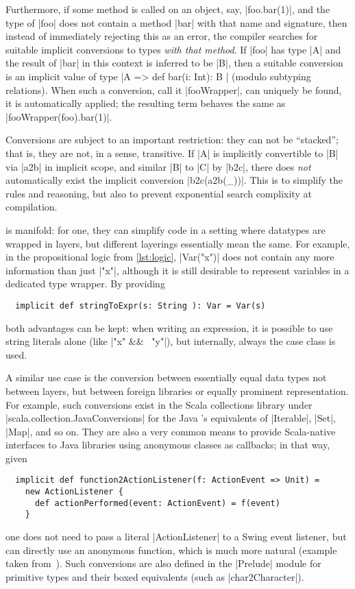 Furthermore, if some method is called on an object, say, |foo.bar(1)|, and the type of |foo| does
not contain a method |bar| with that name and signature, then instead of immediately rejecting this
as an error, the compiler searches for suitable implicit conversions to types \emph{with that
  method}. If |foo| has type |A| and the result of |bar| in this context is inferred to be |B|, then
a suitable conversion is an implicit value of type |A => { def bar(i: Int): B }| (modulo subtyping
relations). When such a conversion, call it |fooWrapper|, can uniquely be found, it is automatically
applied; the resulting term behaves the same as |fooWrapper(foo).bar(1)|.

Conversions are subject to an important restriction: they can not be \enquote{stacked}; that is,
they are not, in a sense, transitive. If |A| is implicitly convertible to |B| via |a2b| in implicit
scope, and similar |B| to |C| by |b2c|, there does \emph{not} automatically exist the implicit
conversion |b2c(a2b(_))|. This is to simplify the rules and reasoning, but also to prevent
exponential search complixity at compilation.

 is manifold: for one, they can simplify code in a
setting where datatypes are wrapped in layers, but different layerings essentially mean the
same. For example, in the propositional logic \dsl{} from \autoref{lst:logic}, |Var("x")| does not
contain any more information than just |"x"|, although it is still desirable to represent variables
in a dedicated type wrapper. By providing
\begin{lstlisting}
  implicit def stringToExpr(s: String ): Var = Var(s)
\end{lstlisting}
both advantages can be kept: when writing an expression, it is possible to use string literals alone
(like |"x" && ~"y"|), but internally, always the case class is used.

A similar use case is the conversion between essentially equal data types not between layers, but
between foreign libraries or equally prominent representation. For example, such conversions exist
in the Scala collections library under |scala.collection.JavaConversions| for the Java
's equivalents of |Iterable|, |Set|, |Map|, and so on. They are also a very common means
to provide Scala-native interfaces to Java libraries using anonymous classes as callbacks; in that
way, given
\begin{lstlisting}
  implicit def function2ActionListener(f: ActionEvent => Unit) = 
    new ActionListener {
      def actionPerformed(event: ActionEvent) = f(event)
    }
\end{lstlisting}
one does not need to pass a literal |ActionListener| to a Swing event listener, but can directly use
an anonymous function, which is much more natural (example taken
from~\cite[][p.~444]{odersky2008:programming}). Such conversions are also defined in the |Prelude|
module for primitive types and their boxed equivalents (such as |char2Character|).

